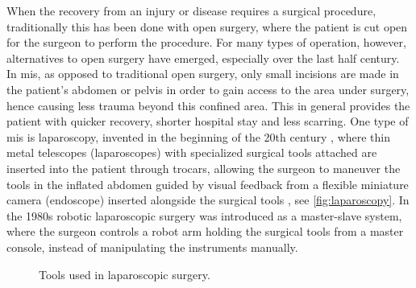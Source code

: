 \vspace{-3mm}
When the recovery from an injury or disease requires a surgical procedure, traditionally this has been done with open surgery, where the patient is cut open for the surgeon to perform the procedure. For many types of operation, however, alternatives to open surgery have emerged, especially over the last half century.
In \gls{mis}, as opposed to traditional open surgery, only small incisions are made in the patient's abdomen or pelvis in order to gain access to the area under surgery, hence causing less trauma beyond this confined area. This in general provides the patient with quicker recovery, shorter hospital stay and less scarring.
One type of \gls{mis} is \gls{laparoscopy}, invented in the beginning of the 20th century \citep{bib:laparoscopy}, where thin metal telescopes (laparoscopes) with specialized surgical tools attached are inserted into the patient through trocars, allowing the surgeon to maneuver the tools in the inflated abdomen guided by visual feedback from a flexible miniature camera (\gls{endoscope}) inserted alongside the surgical tools \citep{bib:fascrs}, see \autoref{fig:laparoscopy}.
In the 1980s robotic laparoscopic surgery was introduced as a master-slave system, where the surgeon controls a robot arm holding the surgical tools from a master console, instead of manipulating the instruments manually.

\vspace*{3mm}
\begin{figure}[htbp]
\centering
\begin{minipage}{0.39\textwidth}
%
\vspace*{3mm}
%
\end{minipage}
\hspace*{5mm}
\begin{minipage}{0.258\textwidth}
%
\end{minipage}
\hspace*{5mm}
\begin{minipage}{0.258\textwidth}
%
\end{minipage}
\caption{Tools used in laparoscopic surgery.}
\label{fig:laparoscopy}
\end{figure}


